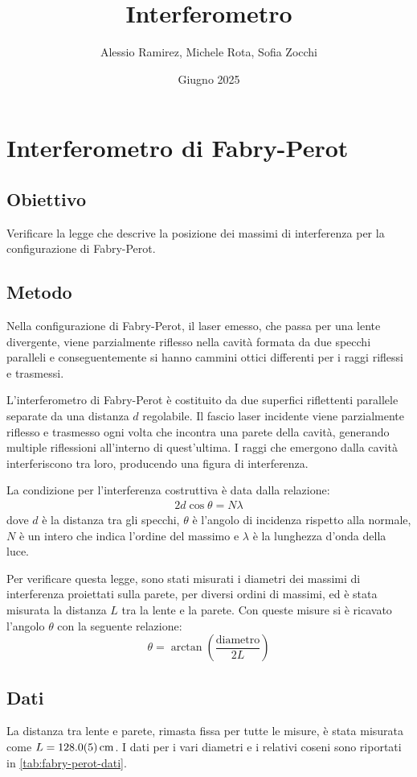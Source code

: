 \documentclass[a4paper]{article}
\title{Interferometro}
\author{Alessio Ramirez, Michele Rota, Sofia Zocchi}
\date{Giugno 2025}
\begin{document}
\maketitle
\tableofcontents

\section{Interferometro di Fabry-Perot}
\subsection{Obiettivo}
Verificare la legge che descrive la posizione dei massimi di interferenza per la configurazione di Fabry-Perot.

\subsection{Metodo}
Nella configurazione di Fabry-Perot, il laser emesso, che passa per una lente divergente, viene parzialmente riflesso nella cavità formata da due specchi paralleli e conseguentemente si hanno cammini ottici differenti per i raggi riflessi e trasmessi. 

L'interferometro di Fabry-Perot è costituito da due superfici riflettenti parallele separate da una distanza $d$ regolabile. Il fascio laser incidente viene parzialmente riflesso e trasmesso ogni volta che incontra una parete della cavità, generando multiple riflessioni all'interno di quest'ultima. I raggi che emergono dalla cavità interferiscono tra loro, producendo una figura di interferenza.

La condizione per l'interferenza costruttiva è data dalla relazione:
\begin{align}
    2d \cos \theta = N\lambda
\end{align}
dove $d$ è la distanza tra gli specchi, $\theta$ è l'angolo di incidenza rispetto alla normale, $N$ è un intero che indica l'ordine del massimo e $\lambda$ è la lunghezza d'onda della luce.

Per verificare questa legge, sono stati misurati i diametri dei massimi di interferenza proiettati sulla parete, per diversi ordini di massimi, ed è stata misurata la distanza $L$ tra la lente e la parete. Con queste misure si è ricavato l'angolo $\theta$ con la seguente relazione:
\[\theta = \arctan \left(\frac{\text{diametro}}{2L}\right)\]

\subsection{Dati}
La distanza tra lente e parete, rimasta fissa per tutte le misure, è stata misurata come $L=\SI{128 \pm 0.5}{\centi\meter}$. I dati per i vari diametri e i relativi coseni sono riportati in \cref{tab:fabry-perot-dati}.
\end{document}
